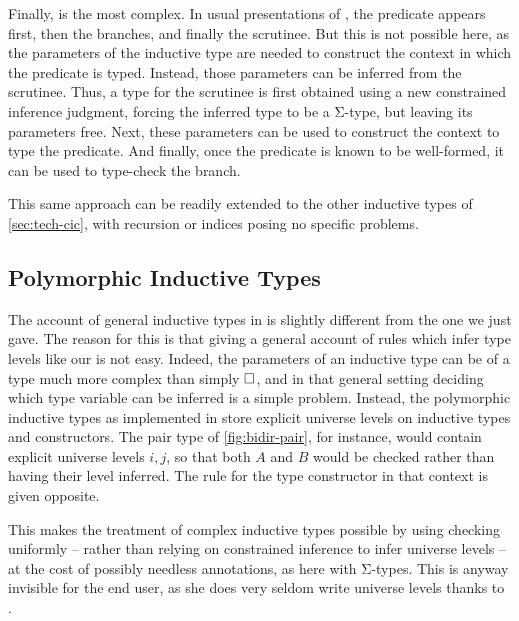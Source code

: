 Finally,  is the most complex.
In usual presentations of , the predicate appears first, then the branches,
and finally the scrutinee. But this is not possible here, as the parameters of the inductive
type are needed to construct the context in which the predicate is typed.
Instead, those parameters can be inferred from the scrutinee.
Thus, a type for the scrutinee is first obtained using a new constrained inference judgment,
forcing the inferred type to be a Σ-type, but leaving its parameters free.
Next, these parameters can be used to construct the context to type the predicate.
And finally, once the predicate is known to be well-formed,
it can be used to type-check the branch.

This same approach can be readily extended to the other inductive types of
\cref{sec:tech-cic}, with recursion or indices posing no specific problems.

\subsection{Polymorphic Inductive Types}

The account of general inductive types in  is slightly different from
the one we just gave. The reason for this is that giving a general account of rules
which infer type levels like our  is not easy.
Indeed, the parameters of an inductive type can
be of a type much more complex than simply $\uni$, and in that general setting deciding which
type variable can be inferred is a simple problem.
Instead, the polymorphic inductive types as implemented in  store explicit universe
levels on inductive types and constructors. The  pair type of \cref{fig:bidir-pair},
for instance, would contain explicit universe levels $i,j$, so that both $A$ and $B$
would be checked rather than having their level inferred.
The rule for the type constructor in that context is given opposite.
\begin{marginfigure}
    {}
\end{marginfigure}
This makes the treatment of complex inductive types possible by using checking uniformly –
rather than relying on constrained inference to infer universe levels –
at the cost of possibly needless annotations, as here with Σ-types.
This is anyway invisible for the end user, as she does very seldom write universe
levels thanks to .

